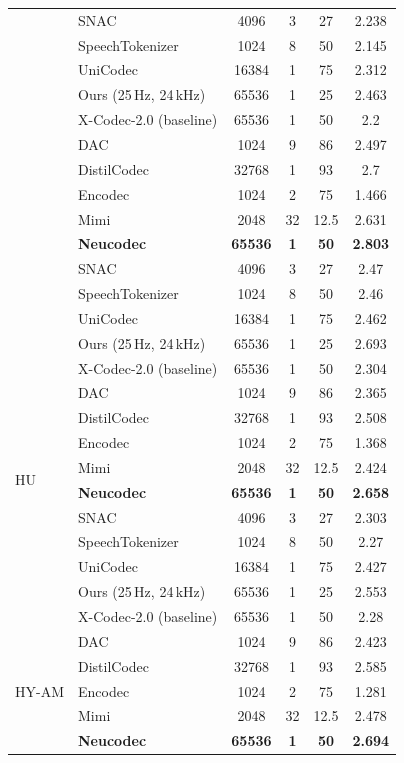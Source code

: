 \documentclass[preprint]{article}
\begin{document}
\begin{longtable}{llcccc}
  & SNAC & 4096 & 3 & 27 & 2.238 \\
  & SpeechTokenizer & 1024 & 8 & 50 & 2.145 \\
  & UniCodec & 16384 & 1 & 75 & 2.312 \\
  & Ours (25\,Hz, 24\,kHz) & 65536 & 1 & 25 & 2.463 \\
  & X-Codec-2.0 (baseline) & 65536 & 1 & 50 & 2.2 \\
\newpage
\multirow{8}{*}{HSB}
  & DAC & 1024 & 9 & 86 & 2.497 \\
  & DistilCodec & 32768 & 1 & 93 & 2.7 \\
  & Encodec & 1024 & 2 & 75 & 1.466 \\
  & Mimi & 2048 & 32 & 12.5 & 2.631 \\
  & \textbf{Neucodec} & \textbf{65536} & \textbf{1} & \textbf{50} & \textbf{2.803} \\
  & SNAC & 4096 & 3 & 27 & 2.47 \\
  & SpeechTokenizer & 1024 & 8 & 50 & 2.46 \\
  & UniCodec & 16384 & 1 & 75 & 2.462 \\
  & Ours (25\,Hz, 24\,kHz) & 65536 & 1 & 25 & 2.693 \\
  & X-Codec-2.0 (baseline) & 65536 & 1 & 50 & 2.304 \\
\midrule
\multirow{8}{*}{HU}
  & DAC & 1024 & 9 & 86 & 2.365 \\
  & DistilCodec & 32768 & 1 & 93 & 2.508 \\
  & Encodec & 1024 & 2 & 75 & 1.368 \\
  & Mimi & 2048 & 32 & 12.5 & 2.424 \\
  & \textbf{Neucodec} & \textbf{65536} & \textbf{1} & \textbf{50} & \textbf{2.658} \\
  & SNAC & 4096 & 3 & 27 & 2.303 \\
  & SpeechTokenizer & 1024 & 8 & 50 & 2.27 \\
  & UniCodec & 16384 & 1 & 75 & 2.427 \\
  & Ours (25\,Hz, 24\,kHz) & 65536 & 1 & 25 & 2.553 \\
  & X-Codec-2.0 (baseline) & 65536 & 1 & 50 & 2.28 \\
\midrule
\multirow{8}{*}{HY-AM}
  & DAC & 1024 & 9 & 86 & 2.423 \\
  & DistilCodec & 32768 & 1 & 93 & 2.585 \\
  & Encodec & 1024 & 2 & 75 & 1.281 \\
  & Mimi & 2048 & 32 & 12.5 & 2.478 \\
  & \textbf{Neucodec} & \textbf{65536} & \textbf{1} & \textbf{50} & \textbf{2.694} \\

\end{longtable}
\end{document}
